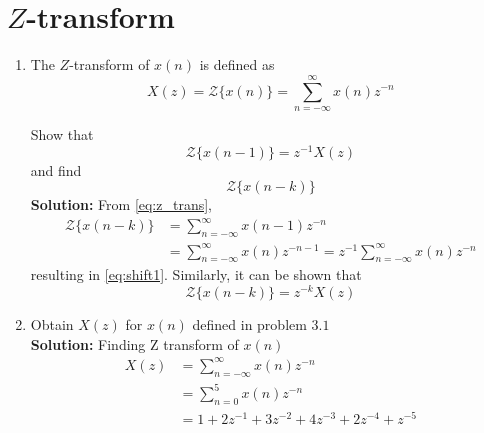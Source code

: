 \documentclass[journal,12pt,twocolumn]{IEEEtran}
\newcommand{\solution}{\noindent \textbf{Solution: }}
\numberwithin{equation}{section}
\renewcommand\thesection{\arabic{section}}
\renewcommand\thesection{\arabic{section}}
\begin{document}
\section{$Z$-transform}
\begin{enumerate}[label=\thesection.\arabic*]
\item The $Z$-transform of $x(n)$ is defined as
%
\begin{equation}
\label{eq:z_trans}
X(z)={\mathcal {Z}}\{x(n)\}=\sum _{n=-\infty }^{\infty }x(n)z^{-n}
\end{equation}
%

Show that
\begin{equation}
\label{eq:shift1}
{\mathcal {Z}}\{x(n-1)\} = z^{-1}X(z)
\end{equation}
and find
\begin{equation}
	{\mathcal {Z}}\{x(n-k)\} 
\end{equation}
\solution From \eqref{eq:z_trans},
\begin{align}
{\mathcal {Z}}\{x(n-k)\} &=\sum _{n=-\infty }^{\infty }x(n-1)z^{-n}
\\
&=\sum _{n=-\infty }^{\infty }x(n)z^{-n-1} = z^{-1}\sum _{n=-\infty }^{\infty }x(n)z^{-n}
\end{align}
resulting in \eqref{eq:shift1}. Similarly, it can be shown that
%
\begin{equation}
\label{eq:z_trans_shift}
	{\mathcal {Z}}\{x(n-k)\} = z^{-k}X(z)
\end{equation}
\item Obtain $X(z)$ for $x(n)$ defined in problem $3.1$\\
\solution Finding Z transform of $x(n)$\\
\begin{align}
	X(z)&=\sum_{n=-\infty }^{\infty }x(n)z^{-n}\\
	&=\sum_{n=0 }^{5}x(n)z^{-n}\\
	&= 1 + 2z^{-1} + 3z^{-2} + 4z^{-3} + 2z^{-4} + z^{-5}
\end{align}
	

\end{enumerate}
\end{document}
